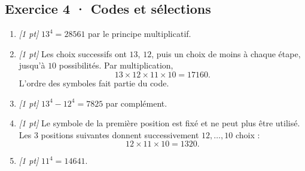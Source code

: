 \subsection*{Exercice 4 · Codes et sélections}\begin{enumerate}

\item \textit{[1 pt]} $13^4=28561$ par le principe multiplicatif.

\item \textit{[1 pt]} Les choix successifs ont $13$, $12$, puis un choix de moins à chaque étape, jusqu'à $10$ possibilités. Par multiplication,
\[13\times12\times11\times10=17160.\]
L'ordre des symboles fait partie du code.

\item \textit{[1 pt]} $13^4-12^4=7825$ par complément.

\item \textit{[1 pt]} Le symbole de la première position est fixé et ne peut plus être utilisé. Les $3$ positions suivantes donnent successivement $12,\ldots,10$ choix :
\[12\times11\times10=1320.\]

\item \textit{[1 pt]} $11^4=14641$.

\end{enumerate}

\fi

\fi

